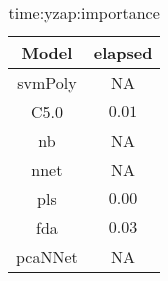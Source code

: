 \begin{table}[!ht]
	\centering
	\begin{tabular}{|c|c|}
		\hline
		Model & elapsed \\ \hline
		svmPoly & NA \\ \hline
		C5.0 & $0.01$ \\ \hline
		nb & NA \\ \hline
		nnet & NA \\ \hline
		pls & $0.00$ \\ \hline
		fda & $0.03$ \\ \hline
		pcaNNet & NA \\ \hline
	\end{tabular}
	\caption{time:yzap:importance}
	\label{tab:time:yzap:importance}
\end{table}
